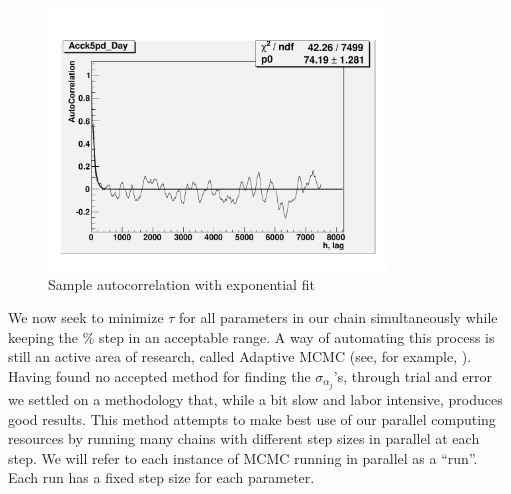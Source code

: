 \begin{figure}
\centering
\includegraphics[width=0.8\textwidth]{Figures/MCMC/autoCorrGood}
\caption{Sample autocorrelation with exponential fit
\label{GoodAutoCorr}}
\end{figure}

We now seek to minimize $\tau$ for all parameters in our chain
simultaneously while keeping the \% step in an acceptable range.  A
way of automating this process is still an active area of research,
called Adaptive MCMC (see, for example, \cite{DynamicStepPaper}).
Having found no accepted method for finding the $\sigma_{\alpha_j}$'s,
through trial and error we settled on a methodology that, while a bit
slow and labor intensive, produces good results.  This method attempts
to make best use of our parallel computing resources by running many
chains with different step sizes in parallel at each step.  We will
refer to each instance of MCMC running in parallel as a ``run''.  Each
run has a fixed step size for each parameter.

